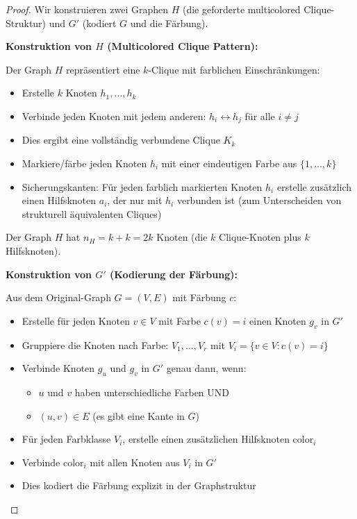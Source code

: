 ﻿\documentclass[a4paper,12pt]{article}
\theoremstyle{definition}
\begin{document}
\begin{proof}
	Wir konstruieren zwei Graphen $H$ (die geforderte multicolored Clique-Struktur) und $G'$ (kodiert $G$ und die Färbung).
	
	\textbf{Konstruktion von $H$ (Multicolored Clique Pattern):}
	
	Der Graph $H$ repräsentiert eine $k$-Clique mit farblichen Einschränkungen:
	\begin{itemize}
		\item Erstelle $k$ Knoten $h_1, \ldots, h_k$
		\item Verbinde jeden Knoten mit jedem anderen: $h_i \leftrightarrow h_j$ für alle $i \neq j$
		\item Dies ergibt eine vollständig verbundene Clique $K_k$
		\item Markiere/färbe jeden Knoten $h_i$ mit einer eindeutigen Farbe aus $\{1, \ldots, k\}$
		\item Sicherungskanten: Für jeden farblich markierten Knoten $h_i$ erstelle zusätzlich einen Hilfsknoten $a_i$, der nur mit $h_i$ verbunden ist (zum Unterscheiden von strukturell äquivalenten Cliques)
	\end{itemize}
	
	Der Graph $H$ hat $n_H = k + k = 2k$ Knoten (die $k$ Clique-Knoten plus $k$ Hilfsknoten).
	
	\textbf{Konstruktion von $G'$ (Kodierung der Färbung):}
	
	Aus dem Original-Graph $G = (V, E)$ mit Färbung $c$:
	\begin{itemize}
		\item Erstelle für jeden Knoten $v \in V$ mit Farbe $c(v) = i$ einen Knoten $g_v$ in $G'$
		\item Gruppiere die Knoten nach Farbe: $V_1, \ldots, V_r$ mit $V_i = \{v \in V : c(v) = i\}$
		\item Verbinde Knoten $g_u$ und $g_v$ in $G'$ genau dann, wenn:
		\begin{itemize}
			\item $u$ und $v$ haben unterschiedliche Farben UND
			\item $(u, v) \in E$ (es gibt eine Kante in $G$)
		\end{itemize}
		\item Für jeden Farbklasse $V_i$, erstelle einen zusätzlichen Hilfsknoten $\text{color}_i$
		\item Verbinde $\text{color}_i$ mit allen Knoten aus $V_i$ in $G'$
		\item Dies kodiert die Färbung explizit in der Graphstruktur
	\end{itemize}
	

\end{proof}
\end{document}
